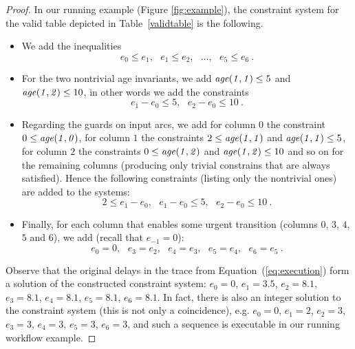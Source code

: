 \begin{proof}
In our running example (Figure \ref{fig:example}), the constraint system for the valid table
depicted in Table~\ref{validtable} is the following.
\begin{itemize}
\item We add the inequalities
$$e_0 \leq e_1,\ \ \  e_1 \leq e_2,\ \ \ \ldots,\ \ \ e_5 \leq e_6\ .$$
\item For the two nontrivial age invariants, we add
${\mathit{age({1,1})}} \leq 5$ and ${\mathit{age({1,2})}} \leq 10$, in other words
we add the constraints
$$e_1-e_0 \leq 5,\ \ \  e_2-e_0 \leq 10 \ . $$
\item Regarding the guards on input arcs, we add for column $0$
the constraint $0 \leq{\mathit{age({1,0})}}$, for column $1$ the constraints
$2 \leq {\mathit{age({1,1})}}$ and
${\mathit{age({1,1})}} \leq 5$, for column $2$ the constraints
$0 \leq {\mathit{age({1,2})}}$ and
${\mathit{age({1,2})}} \leq 10$ and so on for the remaining columns (producing
only trivial constrains that are always satisfied). Hence the following
constraints (listing only the nontrivial ones) are added to the systems:
$$2 \leq e_1 - e_0,\ \ \ e_1 - e_0 \leq 5,\ \ \ e_2-e_0 \leq 10\ .$$
\item Finally, for each column that enables some urgent transition 
(columns $0$, $3$, $4$, $5$ and $6$), we add (recall that $e_{-1}=0$):
$$e_0=0, \ \ \ e_3=e_2, \ \ \ e_4=e_3, \ \ \ e_5=e_4, \ \ \ e_6=e_5\ .$$
\end{itemize}

Observe that the original delays in the trace from Equation~(\ref{eq:execution})
form a solution of the constructed constraint system: 
$e_0=0$,
$e_1=3.5$,
$e_2=8.1$,
$e_3=8.1$,
$e_4=8.1$,
$e_5=8.1$,
$e_6=8.1$.
In fact, there is also an integer solution to the constraint system
(this is not only a coincidence),
e.g.
$e_0=0$,
$e_1=2$,
$e_2=3$,
$e_3=3$,
$e_4=3$,
$e_5=3$,
$e_6=3$,
and such a sequence is executable in our running workflow example.


\end{proof}
